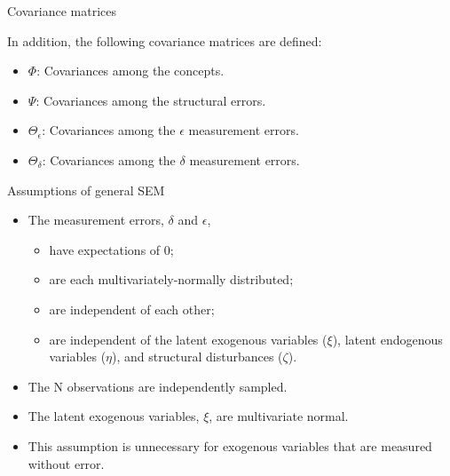 \documentclass[10pt,ignorenonframetext,]{beamer}
\providecommand{\tightlist}{%
\setlength{\itemsep}{0pt}\setlength{\parskip}{0pt}}
\begin{document}
\begin{frame}{Covariance matrices}

In addition, the following covariance matrices are defined:

\begin{itemize}
\tightlist
\item
  \(\Phi\): Covariances among the concepts.
\item
  \(\Psi\): Covariances among the structural errors.
\item
  \(\Theta_\epsilon\): Covariances among the \(\epsilon\) measurement
  errors.
\item
  \(\Theta_\delta\): Covariances among the \(\delta\) measurement
  errors.
\end{itemize}

\end{frame}

\begin{frame}{Assumptions of general SEM}

\begin{itemize}
\tightlist
\item
  The measurement errors, \(\delta\) and \(\epsilon\),

  \begin{itemize}
  \tightlist
  \item
    have expectations of 0;
  \item
    are each multivariately-normally distributed;
  \item
    are independent of each other;
  \item
    are independent of the latent exogenous variables (\(\xi\)), latent
    endogenous variables (\(\eta\)), and structural disturbances
    (\(\zeta\)).
  \end{itemize}
\item
  The N observations are independently sampled.
\item
  The latent exogenous variables, \(\xi\), are multivariate normal.
\item
  This assumption is unnecessary for exogenous variables that are
  measured without error.
\end{itemize}

\end{frame}
\end{document}
